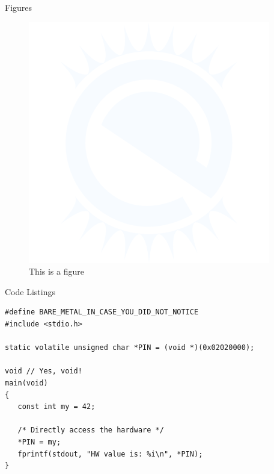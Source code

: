\documentclass[aspectratio=169]{beamer}
\begin{document}
\begin{frame}{Figures}
   \begin{figure}[h!]\centering
      \includegraphics[scale=0.5]{img/e_logo}
      \caption{This is a figure}
   \end{figure}
\end{frame}

\begin{frame}[fragile]{Code Listings}
   \begin{lstlisting}
#define BARE_METAL_IN_CASE_YOU_DID_NOT_NOTICE
#include <stdio.h>

static volatile unsigned char *PIN = (void *)(0x02020000);

void // Yes, void!
main(void)
{
   const int my = 42;

   /* Directly access the hardware */
   *PIN = my;
   fprintf(stdout, "HW value is: %i\n", *PIN);
}
   \end{lstlisting}
\end{frame}
\end{document}
